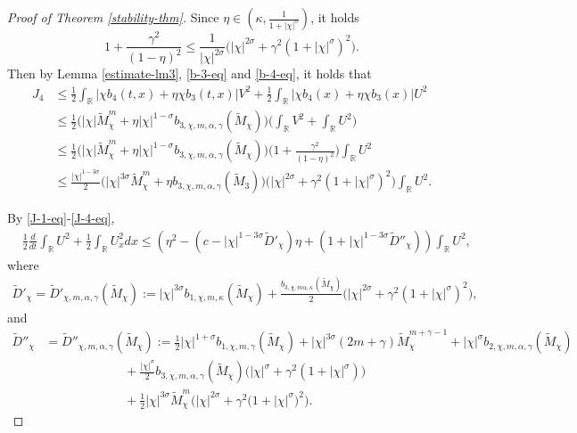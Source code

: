 \documentclass[11pt]{article} %
\theoremstyle{remark}
\theoremstyle{remark}
\numberwithin{equation}{section}
\numberwithin{figure}{section}
\numberwithin{table}{section}
\newcommand\RR{\ensuremath{\mathbb{R}}}
\begin{document}
\begin{proof}[Proof of Theorem \ref{stability-thm}]
Since  $\eta\in (\kappa,\frac{1}{1+|\chi|^\sigma})$, it holds
$$
1+\frac{\gamma^2 }{(1-\eta)^2}\le  \frac{1}{|\chi|^{2\sigma}}\big(|\chi|^{2\sigma}+\gamma^2 (1+|\chi|^\sigma)^2\big).
$$
Then by Lemma \ref{estimate-lm3}, \eqref{b-3-eq} and \eqref{b-4-eq}, it holds that
\begin{align}
\label{J-4-eq}
J_4&\le \frac{1}{2}\int_{\RR}
|\chi b_4(t,x)+\eta \chi b_3(t,x)| V^2+\frac{1}{2} \int_{\RR}
|\chi b_4(x)+\eta \chi b_3(x)| U^2\nonumber\\
&\le \frac{1}{2}\Big(|\chi| \widetilde M_\chi^m +\eta |\chi|^{1-\sigma} b_{3,\chi,m,\alpha,\gamma}(\widetilde M_\chi)\Big)\Big(\int_{\RR} V^2+\int_{\RR} U^2\Big)\nonumber\\
&\le \frac{1}{2}\Big(|\chi| \widetilde M_\chi^m+\eta |\chi|^{1-\sigma} b_{3,\chi,m,\alpha,\gamma}(\widetilde M_\chi)\Big) \Big(1+\frac{\gamma^2}{(1-\eta)^2}\Big)\int_{\RR}U^2\nonumber\\
&\le \frac{|\chi|^{1-3\sigma}}{2}\big(|\chi|^{3\sigma} \widetilde M_\chi^m+\eta b_{3,\chi,m,\alpha,\gamma}(\widetilde M_3)\big)\big(|\chi|^{2\sigma}+\gamma^2 (1+|\chi|^\sigma)^2\big)\int_{\mathbb{R}} U^2.
\end{align}

\smallskip

By \eqref{J-1-eq}-\eqref{J-4-eq}, 
\begin{align}
\label{U-square-eq1}
&\frac{1}{2}\frac{d}{dt}\int_{\RR} U^2+\frac{1}{2}\int_{\RR} U_x^2 dx\le \left( \eta^2 -(c-|\chi|^{1-3\sigma} \widetilde D'_{\chi}) \eta +(1+|\chi|^{1-3\sigma} \widetilde D''_{\chi})\right)\int_{\RR}U^2,
\end{align}
where 
\begin{align}
\label{D-1-eq}
\widetilde D'_\chi=\widetilde D'_{\chi,m,\alpha,\gamma}(\widetilde M_\chi):=|\chi|^{3\sigma} b_{1,\chi,m,\kappa}(\widetilde M_\chi)+\frac{b_{3,\chi,m\alpha,\kappa}(\widetilde M_\chi)}{2}\big(|\chi|^{2\sigma} +\gamma^2 (1+|\chi|^\sigma)^2\big),
\end{align}
and
\begin{align}
\label{D-2-eq}
\widetilde D''_\chi&=\widetilde D''_{\chi,m,\alpha,\gamma}(\widetilde M_\chi):=\frac{1}{2} |\chi|^{1+\sigma} b_{1,\chi,m,\gamma}(\widetilde M_\chi)+|\chi|^{3\sigma} (2m+\gamma)\widetilde M_\chi^{m+\gamma-1}+|\chi|^\sigma b_{2,\chi,m,\alpha,\gamma}(\widetilde M_\chi)\nonumber\\
&\quad \qquad\qquad \quad\,\, +\frac{|\chi|^\sigma}{2} b_{3,\chi,m,\alpha,\gamma}(\widetilde M_\chi) \big(|\chi|^\sigma +\gamma^2 (1+|\chi|^\sigma)\big) \nonumber\\
&\quad\qquad\qquad\quad\,\,  +\frac{1}{2} |\chi|^{3\sigma} \widetilde M_\chi^m \big(|\chi|^{2\sigma}+\gamma^2 \big(1+|\chi|^\sigma)^2\big).
\end{align}




\end{proof}
\end{document}
